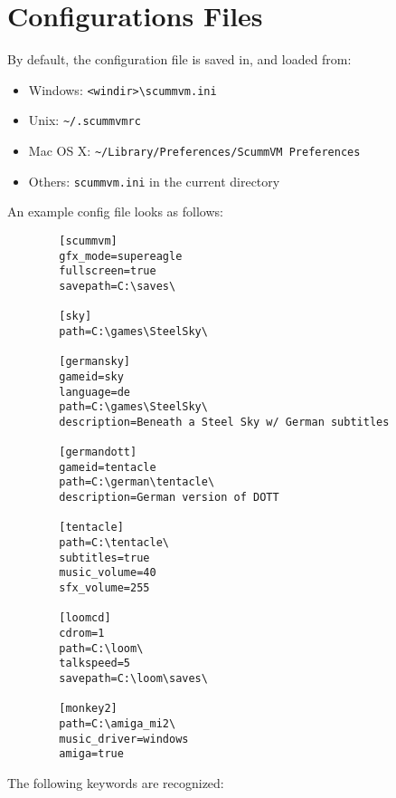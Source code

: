 

\section{Configurations Files}


By default, the configuration file is saved in, and loaded from:
%
\begin{itemize}
\item Windows: \verb#<windir>\scummvm.ini#
\item Unix: \verb#~/.scummvmrc#
\item Mac OS X: \verb#~/Library/Preferences/ScummVM Preferences#
\item Others: \verb#scummvm.ini# in the current directory
\end{itemize}
%
An example config file looks as follows:
%
\begin{verbatim}
        [scummvm]
        gfx_mode=supereagle
        fullscreen=true
        savepath=C:\saves\

        [sky]
        path=C:\games\SteelSky\

        [germansky]
        gameid=sky
        language=de
        path=C:\games\SteelSky\
        description=Beneath a Steel Sky w/ German subtitles
        
        [germandott]
        gameid=tentacle
        path=C:\german\tentacle\
        description=German version of DOTT

        [tentacle]
        path=C:\tentacle\
        subtitles=true
        music_volume=40
        sfx_volume=255

        [loomcd]
        cdrom=1
        path=C:\loom\
        talkspeed=5
        savepath=C:\loom\saves\
        
        [monkey2]
        path=C:\amiga_mi2\
        music_driver=windows
        amiga=true
\end{verbatim}
%
The following keywords are recognized:

